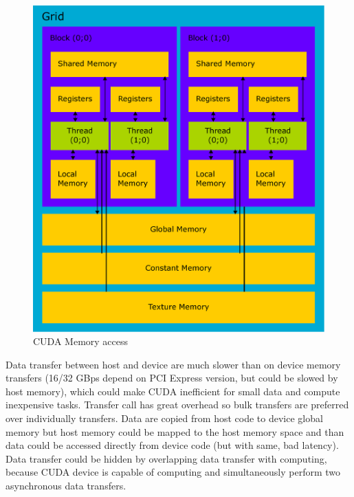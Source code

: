 \begin{figure}[h]
  \centering
  \includegraphics[width=0.6\linewidth]{img/CUDAmemAccess.eps}
  \caption{CUDA Memory access}
  \label{fig:cudamemaccess}
\end{figure}

Data transfer between host and device are much slower than on device memory transfers (16/32 GBps depend on PCI Express version, but could be slowed by host memory), which could make CUDA inefficient for small data and compute inexpensive tasks. Transfer call has great overhead so bulk transfers are preferred over individually transfers. Data are copied from host code to device global memory but host memory could be mapped to the host memory space and than data could be accessed directly from device code (but with same, bad latency). Data transfer could be hidden by overlapping data transfer with computing, because CUDA device is capable of computing and simultaneously perform two asynchronous data transfers.

